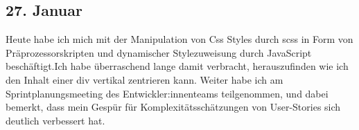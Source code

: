 \subsection{27. Januar}
Heute habe ich mich mit der Manipulation von Css Styles durch scss in Form von Präprozessorskripten und dynamischer Stylezuweisung durch JavaScript beschäftigt.Ich habe überraschend lange damit verbracht, herauszufinden wie ich den Inhalt einer div vertikal zentrieren kann. Weiter habe ich am Sprintplanungsmeeting des Entwickler:innenteams teilgenommen, und dabei bemerkt, dass mein Gespür für Komplexitätsschätzungen von User-Stories sich deutlich verbessert hat.